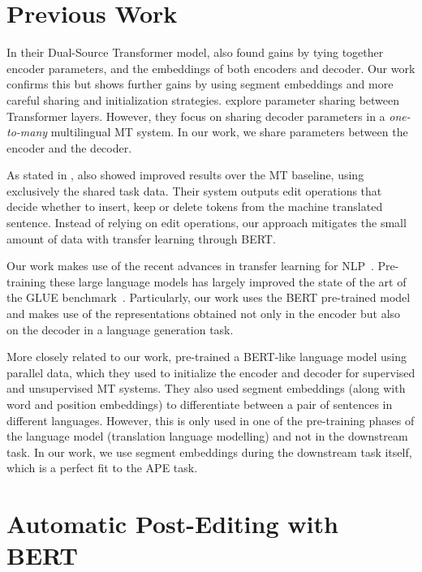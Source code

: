 \section{Previous Work}

In their Dual-Source Transformer model, \citet{junczys2018ms} also
found gains by tying together encoder parameters, and the embeddings
of both encoders and decoder. Our work confirms this but shows
further gains by using segment embeddings and more careful sharing
and initialization strategies. \citet{sachan2018parameter} explore
parameter sharing between Transformer layers. However, they focus on
sharing decoder parameters in a \emph{one-to-many} multilingual MT
system. In our work, we share parameters between the encoder and the
decoder.

As stated in , \citet{berard2017lig} also
showed improved results over the MT baseline, using exclusively the
shared task data. Their system outputs edit operations that decide
whether to insert, keep or delete tokens from the machine translated
sentence. Instead of relying on edit operations, our approach
mitigates the small amount of data with transfer learning through
BERT.

Our work makes use of the recent advances in transfer learning for
NLP~\citep{peters2018deep, howard2018universal, radford2018improving,
  devlin2018bert}. Pre-training these large language models has largely
improved the state of the art of the GLUE
benchmark~\citep{wang2018glue}. Particularly, our work uses the BERT
pre-trained model and makes use of the representations obtained not
only in the encoder but also on the decoder in a language generation
task.

More closely related to our work, \citet{lample2019cross}
pre-trained a BERT-like language model using parallel data, which
they used to initialize the encoder and decoder for supervised and
unsupervised MT systems. They also used segment embeddings (along
with word and position embeddings) to differentiate between a pair of
sentences in different languages. However, this is only used in one
of the pre-training phases of the language model (translation
language modelling) and not in the downstream task. In our work, we
use segment embeddings during the downstream task itself, which is a
perfect fit to the APE task.

\section{Automatic Post-Editing with BERT}\label{sec:ape_bert}

